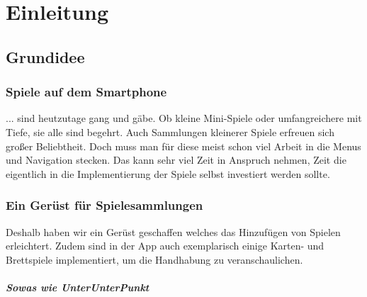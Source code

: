 \chapter{Einleitung}

\section{Grundidee}

\subsection{Spiele auf dem Smartphone}
... sind heutzutage gang und gäbe. Ob kleine Mini-Spiele oder umfangreichere mit Tiefe, sie alle sind begehrt. Auch Sammlungen kleinerer Spiele erfreuen sich großer Beliebtheit.
Doch muss man für diese meist schon viel Arbeit in die Menus und Navigation stecken. Das kann sehr viel Zeit in Anspruch nehmen, 
Zeit die eigentlich in die Implementierung der Spiele selbst investiert werden sollte.
\subsection{Ein Gerüst für Spielesammlungen}
Deshalb haben wir ein Gerüst geschaffen welches das Hinzufügen von Spielen erleichtert. Zudem sind in der App auch exemplarisch einige Karten- 
und Brettspiele implementiert, um die Handhabung zu veranschaulichen.

\paragraph{Sowas wie UnterUnterPunkt}